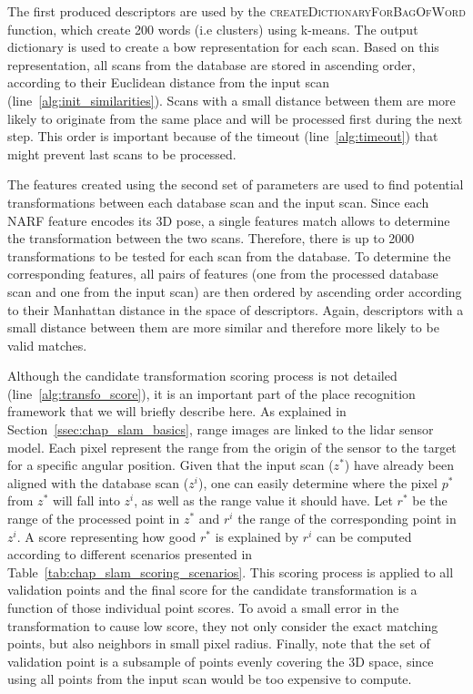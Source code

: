 The first produced descriptors are used by the \textsc{createDictionaryForBagOfWord} function, which create 200 words (i.e clusters) using k-means. The output dictionary is used to create a \gls*{bow} representation for each scan. Based on this representation, all scans from the database are stored in ascending order, according to their Euclidean distance from the input scan (line~\ref{alg:init_similarities}). Scans with a small distance between them are more likely to originate from the same place and will be processed first during the next step. This order is important because of the timeout (line~\ref{alg:timeout}) that might prevent last scans to be processed.

The features created using the second set of parameters are used to find potential transformations between each database scan and the input scan. Since each NARF feature encodes its 3D pose, a single features match allows to determine the transformation between the two scans. Therefore, there is up to 2000 transformations to be tested for each scan from the database. To determine the corresponding features, all pairs of features (one from the processed database scan and one from the input scan) are then ordered by ascending order according to their Manhattan distance in the space of descriptors. Again, descriptors with a small distance between them are more similar and therefore more likely to be valid matches.

Although the candidate transformation scoring process is not detailed (line~\ref{alg:transfo_score}), it is an important part of the place recognition framework that we will briefly describe here. As explained in Section~\ref{ssec:chap_slam_basics}, range images are linked to the \gls*{lidar} sensor model. Each pixel represent the range from the origin of the sensor to the target for a specific angular position. Given that the input scan ($z^*$) have already been aligned with the database scan ($z^i$), one can easily determine where the pixel $p^*$ from $z^*$ will fall into $z^i$, as well as the range value it should have. Let $r^*$ be the range of the processed point in $z^*$ and $r^i$ the range of the corresponding point in $z^i$. A score representing how good $r^*$ is explained by $r^i$ can be computed according to different scenarios presented in Table~\ref{tab:chap_slam_scoring_scenarios}.
This scoring process is applied to all validation points and the final score for the candidate transformation is a function of those individual point scores. To avoid a small error in the transformation to cause low score, they not only consider the exact matching points, but also neighbors in small pixel radius. Finally, note that the set of validation point is a subsample of points evenly covering the 3D space, since using all points from the input scan would be too expensive to compute.

